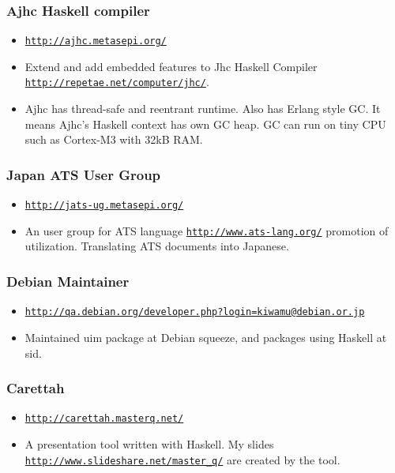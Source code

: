\documentclass[letterpaper]{article}
\begin{document}
\subsubsection*{Ajhc Haskell compiler}
\begin{itemize}
\item \href{http://ajhc.metasepi.org/}{\tt http://ajhc.metasepi.org/}
\item Extend and add embedded features to Jhc Haskell Compiler \href{http://repetae.net/computer/jhc/}{\tt http://repetae.net/computer/jhc/}.
\item Ajhc has thread-safe and reentrant runtime. Also has Erlang style GC. It means Ajhc's Haskell context has own GC heap. GC can run on tiny CPU such as Cortex-M3 with 32kB RAM.
\end{itemize}

\subsubsection*{Japan ATS User Group}
\begin{itemize}
\item \href{http://jats-ug.metasepi.org/}{\tt http://jats-ug.metasepi.org/}
\item An user group for ATS language \href{http://www.ats-lang.org/}{\tt http://www.ats-lang.org/} promotion of utilization. Translating ATS documents into Japanese.
\end{itemize}

\subsubsection*{Debian Maintainer}
\begin{itemize}
\item \href{http://qa.debian.org/developer.php?login=kiwamu@debian.or.jp}{\tt http://qa.debian.org/developer.php?login=kiwamu@debian.or.jp}
\item Maintained uim package at Debian squeeze, and packages using Haskell at sid.
\end{itemize}

\subsubsection*{Carettah}
\begin{itemize}
\item \href{http://carettah.masterq.net/}{\tt http://carettah.masterq.net/}
\item A presentation tool written with Haskell. My slides \href{http://www.slideshare.net/master\_q/}{\tt http://www.slideshare.net/master\_q/} are created by the tool.
\end{itemize}
\end{document}
